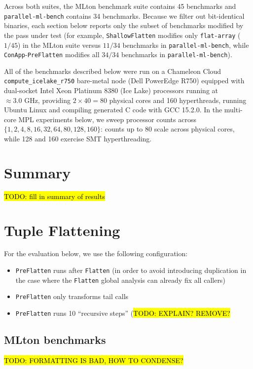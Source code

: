 Across both suites, the MLton benchmark suite contains 45 benchmarks and
\texttt{parallel-ml-bench} contains 34 benchmarks. Because we filter out
bit-identical binaries, each section below reports only the subset of benchmarks
modified by the pass under test (for example, \texttt{ShallowFlatten} modifies
only \texttt{flat-array} ($1/45$) in the MLton suite versus $11/34$ benchmarks
in \texttt{parallel-ml-bench}, while \texttt{ConApp}-\texttt{PreFlatten}
modifies all $34/34$ benchmarks in \texttt{parallel-ml-bench}).

All of the benchmarks described below were run on a Chameleon Cloud
\texttt{compute\_icelake\_r750} bare-metal node (Dell PowerEdge R750) equipped
with dual-socket Intel Xeon Platinum 8380 (Ice Lake) processors running at
$\approx 3.0\text{ GHz}$, providing $2 \times 40 = 80$ physical cores and 160
hyperthreads, running Ubuntu Linux and compiling generated C code with GCC
15.2.0. In the multi-core MPL experiments below, we sweep processor counts
across $\{1, 2, 4, 8, 16, 32, 64, 80, 128, 160\}$: counts up to 80 scale across
physical cores, while 128 and 160 exercise SMT hyperthreading.


\section{Summary}

\hl{TODO: fill in summary of results}

\FloatBarrier
\section{Tuple Flattening}
For the evaluation below, we use the following configuration:
\begin{itemize}

\item \texttt{PreFlatten} runs after \texttt{Flatten} (in order to avoid
  introducing duplication in the case where the \texttt{Flatten} global analysis
  can already fix all callers)

\item \texttt{PreFlatten} only transforms tail calls

\item \texttt{PreFlatten} runs 10 ``recursive steps'' (\hl{TODO: EXPLAIN? REMOVE?}

\end{itemize}


\subsection{MLton benchmarks}
\hl{TODO: FORMATTING IS BAD, HOW TO CONDENSE?}

